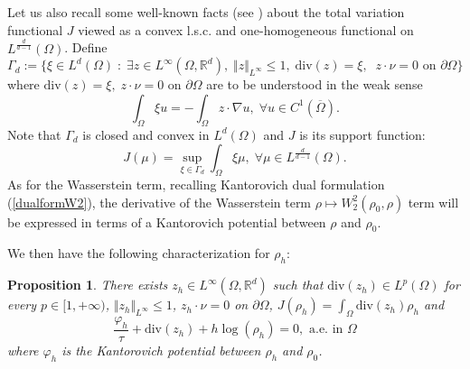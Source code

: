 \documentclass[12pt, a4paper]{article}
\numberwithin{equation}{section}
\theoremstyle{plain}
\newtheorem{prop}[thm]{Proposition}
\theoremstyle{definition}
\theoremstyle{remark}
\newcommand{\R}{\mathbb{R}}
\newcommand{\dive}{\mathrm{div}}
\newcommand{\Omb}{\overline{\Omega}}
\newcommand\pref[1]{(\ref{#1})}
\begin{document}
Let us also recall some well-known facts (see \cite{chambolleintro})  about the total variation functional $J$ viewed as a convex l.s.c. and one-homogeneous functional on  $L^{\frac{d}{d-1}}(\Omega)$. Define 
\begin{equation}
\Gamma_d:=\Big\{ \xi\in L^d(\Omega) \; : \; \exists z\in L^{\infty} (\Omega, \R^d), \; \Vert z \Vert_{L^{\infty}} \le 1, \; \dive(z)=\xi, \; \; z\cdot \nu =0 \mbox{ on $\partial \Omega$}\Big\}
\end{equation}
where $\dive(z)=\xi, \;  z\cdot \nu =0$ on $\partial \Omega$ are to be understood in the weak sense
\[\int_{\Omega} \xi u=-\int_{\Omega} z \cdot \nabla u, \; \forall u\in C^1(\Omb).\]
Note that $\Gamma_d$ is closed and convex in $L^d(\Omega)$ and $J$ is its support function:
\begin{equation}\label{tvsupportf}
J(\mu)=\sup_{\xi \in \Gamma_d} \int_{\Omega} \xi \mu, \; \forall \mu \in L^{\frac{d}{d-1}}(\Omega).
\end{equation}
As for the Wasserstein term, recalling Kantorovich dual formulation \pref{dualformW2},  the derivative of the Wasserstein term $\rho \mapsto W^2_2(\rho_0, \rho)$ term will be expressed in terms of a Kantorovich potential between $\rho$ and $\rho_0$.

\smallskip

We then have the following characterization for $\rho_h$:

\begin{prop}\label{optih}
There exists $z_h \in L^{\infty}(\Omega, \R^d)$ such that $\dive(z_h)\in L^{p}(\Omega)$ for every $p\in [1,+\infty)$, $\Vert z_h \Vert_{L^{\infty}} \le 1$, $z_h \cdot \nu=0$ on $\partial \Omega$, $J(\rho_h)=\int_{\Omega} \dive(z_h) \rho_h$ and
\begin{equation}\label{och}
\frac{\varphi_h}{\tau}+ \dive(z_h)+h \log(\rho_h)=0, \mbox{ a.e. in $\Omega$} 
\end{equation}
where $\varphi_h$ is the Kantorovich potential between $\rho_h$ and $\rho_0$.
\end{prop}
\end{document}
